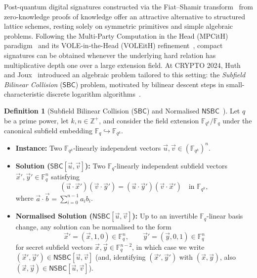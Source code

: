 \documentclass[11pt,a4paper]{article}
\theoremstyle{definition}
\newtheorem{definition}{Definition}
\theoremstyle{remark}
\newcommand{\Fq}{\mathbb{F}_q}
\newcommand{\Fqk}{\mathbb{F}_{q^k}}
\newcommand{\SBC}{\mathsf{SBC}}
\newcommand{\NSBC}{\mathsf{NSBC}}
\begin{document}
Post-quantum digital signatures constructed via the Fiat--Shamir transform~\cite{FS86} from zero-knowledge proofs of knowledge offer an attractive alternative to structured lattice schemes, resting solely on symmetric primitives and simple algebraic problems. Following the Multi-Party Computation in the Head (MPCitH) paradigm~\cite{IKOS07} and its VOLE-in-the-Head (VOLEitH) refinement~\cite{YSWW21,Roy22,BBDKORS23}, compact signatures can be obtained whenever the underlying hard relation has multiplicative depth one over a large extension field. At CRYPTO 2024, Huth and Joux~\cite{HJ24} introduced an algebraic problem tailored to this setting: the \emph{Subfield Bilinear Collision} ($\SBC$) problem, motivated by bilinear descent steps in small-characteristic discrete logarithm algorithms~\cite{JP24}.

\begin{definition}[Subfield Bilinear Collision ($\SBC$) and Normalised $\NSBC$~\cite{HJ24,HJ25}]
\label{def:sbc}
Let $q$ be a prime power, let $k, n \in \mathbb{Z}^+$, and consider the field extension $\Fqk / \Fq$ under the canonical subfield embedding $\Fq \hookrightarrow \Fqk$.
\begin{itemize}[leftmargin=2em]
    \item \textbf{Instance:} Two $\Fqk$-linearly independent vectors $\vec{u}, \vec{v} \in (\Fqk)^n$.
    \item \textbf{Solution ($\SBC[\vec{u}, \vec{v}]$):} Two $\Fq$-linearly independent subfield vectors $\vec{x}', \vec{y}' \in \Fq^n$ satisfying
    \begin{equation}
    \label{eq:sbc}
    (\vec{u} \cdot \vec{x}')(\vec{v} \cdot \vec{y}') = (\vec{u} \cdot \vec{y}')(\vec{v} \cdot \vec{x}') \quad \text{in } \Fqk,
    \end{equation}
    where $\vec{a} \cdot \vec{b} = \sum_{i=0}^{n-1} a_i b_i$.
    \item \textbf{Normalised Solution ($\NSBC[\vec{u}, \vec{v}]$):} Up to an invertible $\Fq$-linear basis change, any solution can be normalised to the form
    \begin{equation}
    \label{eq:nsbc-pad}
    \vec{x}' = (\vec{x}, 1, 0) \in \Fq^n, \qquad \vec{y}' = (\vec{y}, 0, 1) \in \Fq^n
    \end{equation}
    for secret subfield vectors $\vec{x}, \vec{y} \in \Fq^{n-2}$, in which case we write $(\vec{x}', \vec{y}') \in \NSBC[\vec{u}, \vec{v}]$ (and, identifying $(\vec{x}', \vec{y}')$ with $(\vec{x}, \vec{y})$, also $(\vec{x}, \vec{y}) \in \NSBC[\vec{u}, \vec{v}]$).
\end{itemize}
\end{definition}
\end{document}
